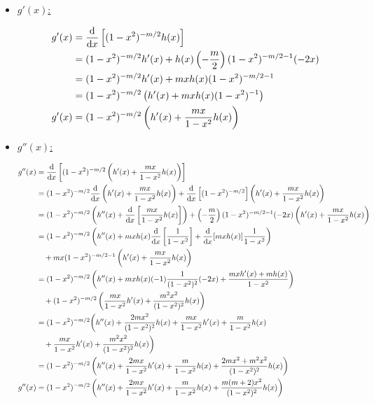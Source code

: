 \documentclass[../johdoksia.tex]{subfiles}
\begin{document}
	\begin{itemize}
		\item \underline{$g'(x)$:}
		
		\begin{align*}
			g'(x) &= \odv{}{x}\left[(1 - x^2)^{-m/2}h(x)\right] \\
			&= (1 - x^2)^{-m/2}h'(x) + h(x)\left(-\frac{m}{2}\right)(1 - x^2)^{-m/2 - 1}(-2x) \\
			&= (1 - x^2)^{-m/2}h'(x) + mxh(x)(1 - x^2)^{-m/2 - 1} \\
			&= (1 - x^2)^{-m/2}\left(h'(x) + mxh(x)(1 - x^2)^{-1}\right) \\
			g'(x) &= (1 - x^2)^{-m/2}\left(h'(x) + \frac{mx}{1 - x^2}h(x)\right)
		\end{align*}
		
		\item \underline{$g''(x)$:}
		
		\begin{align*}
			g''(x) &= \odv{}{x}\left[(1 - x^2)^{-m/2}\left(h'(x) + \frac{mx}{1 - x^2}h(x)\right)\right] \\
			&= (1 - x^2)^{-m/2}\odv{}{x}\left(h'(x) + \frac{mx}{1 - x^2}h(x)\right) + \odv{}{x}\left[(1 - x^2)^{-m/2}\right]\left(h'(x) + \frac{mx}{1 - x^2}h(x)\right) \\
			&= (1 - x^2)^{-m/2}\left(h''(x) + \odv{}{x}\left[\frac{mx}{1 - x^2}h(x)\right]\right) + \left(-\frac{m}{2}\right)(1 - x^2)^{-m/2 - 1}(-2x)\left(h'(x) + \frac{mx}{1 - x^2}h(x)\right) \\
			&= (1 - x^2)^{-m/2}\left(h''(x) + mxh(x)\odv{}{x}\left[\frac{1}{1 - x^2}\right] + \odv{}{x}[mxh(x)]\frac{1}{1 - x^2}\right) \\
			&\quad + mx(1 - x^2)^{-m/2 - 1}\left(h'(x) + \frac{mx}{1 - x^2}h(x)\right) \\
			&= (1 - x^2)^{-m/2}\left(h''(x) + mxh(x)(-1)\frac{1}{(1 - x^2)^2}(-2x) + \frac{mxh'(x) + mh(x)}{1 - x^2}\right) \\
			&\quad + (1 - x^2)^{-m/2}\left(\frac{mx}{1 - x^2}h'(x) + \frac{m^2x^2}{(1 - x^2)^2}h(x)\right) \\
			&= (1 - x^2)^{-m/2}\bigg(h''(x) + \frac{2mx^2}{(1 - x^2)^2}h(x) + \frac{mx}{1 - x^2}h'(x) + \frac{m}{1 - x^2}h(x) \\
			&\quad + \frac{mx}{1 - x^2}h'(x) + \frac{m^2x^2}{(1 - x^2)^2}h(x)\bigg) \\
			&= (1 - x^2)^{-m/2}\left(h''(x) + \frac{2mx}{1 - x^2}h'(x) + \frac{m}{1 - x^2}h(x) + \frac{2mx^2 + m^2x^2}{(1 - x^2)^2}h(x)\right) \\
			g''(x) &= (1 - x^2)^{-m/2}\left(h''(x) + \frac{2mx}{1 - x^2}h'(x) + \frac{m}{1 - x^2}h(x) + \frac{m(m + 2)x^2}{(1 - x^2)^2}h(x)\right) \\
		\end{align*}
	\end{itemize}
\end{document}
